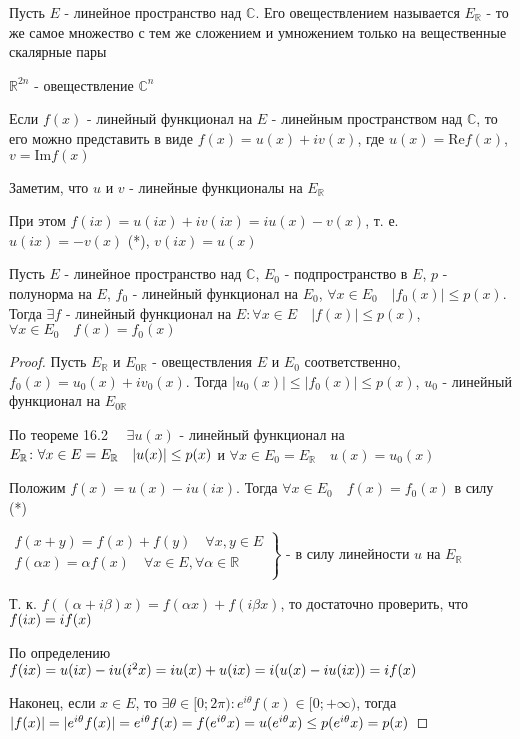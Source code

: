 \documentclass[a4paper,12pt]{report}
\newcommand*{\hm}[1]{#1\nobreak\discretionary{}%
            {\hbox{$\mathsurround=0pt #1$}}{}}
\begin{document}
\begin{df}
Пусть $E$ - линейное пространство над $\mathbb C$. Его овеществлением называется $E_{\mathbb R}$ - то же самое множество с тем же сложением и умножением только на вещественные скалярные пары
\end{df}
 


\begin{ex} 
$\mathbb R^{2n}$ - овеществление $\mathbb C^n$

Если $f(x)$ - линейный функционал на $E$ - линейным пространством над $\mathbb C$, то его можно представить в виде $f(x)=u(x)+iv(x)$, где $u(x)=\mathrm{Re} f(x)$, $v=\mathrm{Im}f(x)$

Заметим, что $u$ и $v$ - линейные функционалы на $E_{\mathbb R}$

При этом $f(ix)=u(ix)+iv(ix)=iu(x)-v(x)$, т. е. $u(ix)=-v(x)$ (*), $v(ix)=u(x)$
\end{ex}
 


\begin{thm} 
Пусть $E$ - линейное пространство над $\mathbb C$, $E_0$ - подпространство в $E$, $p$ - полунорма на $E$, $f_0$ - линейный функционал на $E_0$, $\forall x\in E_0\quad|f_0(x)|\le p(x)$. Тогда $\exists f$ - линейный функционал на $E\colon\forall x\in E\quad|f(x)|\le p(x)$, $\forall x\in E_0\quad f(x)=f_0(x)$
\end{thm}
\begin{proof}
Пусть $E_{\mathbb R}$ и $E_{0\mathbb R}$ - овеществления $E$ и $E_0$ соответственно, $f_0(x)=u_0(x)+iv_0(x)$. Тогда $|u_0(x)|\le|f_0(x)|\le p(x)$, $u_0$ - линейный функционал на $E_{0\mathbb R}$

По теореме 16.2 $\quad\exists u(x)$ - линейный функционал на $E_{\mathbb R}\colon\forall x\in E\hm=E_{\mathbb R}\quad|u(x)|\le p(x)$ и $\forall x\in E_0=E_{\mathbb R}\quad u(x)=u_0(x)$

Положим $f(x)=u(x)-iu(ix)$. Тогда $\forall x\in E_0\quad f(x)=f_0(x)$ в силу (*)

$\left. \begin{array}{r} f(x+y)=f(x)+f(y)\quad\forall x,y\in E \\ f(\alpha x)=\alpha f(x)\quad\forall x\in E,\forall\alpha\in\mathbb R\\ \end{array}\right\}$ - в силу линейности $u$ на $E_{\mathbb R}$

Т. к. $f((\alpha+i\beta)x)=f(\alpha x)+f(i\beta x)$, то достаточно проверить, что $f(ix)\hm=if(x)$

По определению $f(ix)=u(ix)-iu(i^2 x)=iu(x)+u(ix)=i(u(x)-iu(ix))\hm=if(x)$

Наконец, если $x\in E$, то $\exists\theta\in[0;2\pi)\colon e^{i\theta}f(x)\in[0;+\infty)$, тогда $|f(x)|\hm=|e^{i\theta}f(x)|=e^{i\theta}f(x)=f(e^{i\theta}x)=u(e^{i\theta}x)\le p(e^{i\theta}x)=p(x)$
\end{proof}
 
\end{document}
